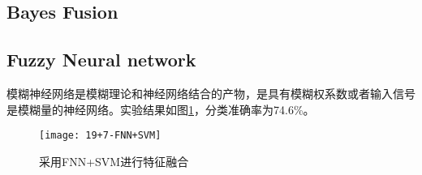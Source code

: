 \subsection{Bayes Fusion}

\subsection{Fuzzy Neural network}
模糊神经网络是模糊理论和神经网络结合的产物，是具有模糊权系数或者输入信号是模糊量的神经网络。实验结果如图\ref{fig:19+7-FNN+SVM}，分类准确率为74.6\%。
\begin{figure}[!ht]
\centering
\texttt{[image: 19+7-FNN+SVM]}
\caption{采用FNN+SVM进行特征融合}
\label{fig:19+7-FNN+SVM}
\end{figure}


%
%
